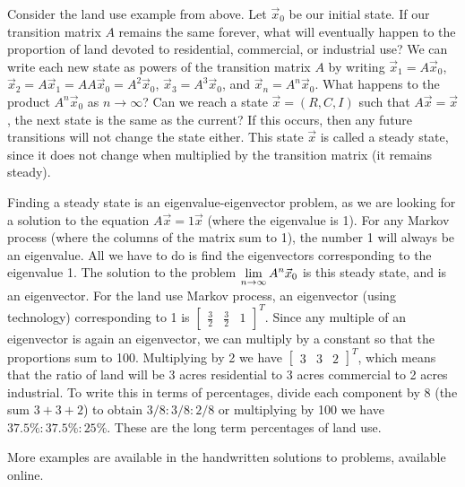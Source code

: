 

Consider the land use example from above.  Let $\vec x_0$ be our initial state. If our transition matrix $A$ remains the same forever, what will eventually happen to the proportion of land devoted to residential, commercial, or industrial use? We can write each new state as powers of the transition matrix $A$ by writing 
$\vec x_{1} = A \vec x_{0}$, $\vec x_{2}=A \vec x_{1} = AA\vec x_{0} = A^2\vec x_{0}$, $\vec x_{3}= A^3\vec x_{0}$, and $\vec x_{n}= A^n\vec x_{0}$.  What happens to the product $A^n\vec x_0$ as $n\to \infty$? Can we reach a state $\vec x = (R,C,I)$ such that $A \vec x=\vec x$, the next state is the same as the current? If this occurs, then any future transitions will not change the state either. This state $\vec x$ is called a steady state, since it does not change when multiplied by the transition matrix (it remains steady). 

Finding a steady state is an eigenvalue-eigenvector problem, as we are looking for a solution to the equation $A\vec x = 1\vec x$ (where the eigenvalue is 1). For any Markov process (where the columns of the matrix sum to 1), the number 1 will always be an eigenvalue. All we have to do is find the eigenvectors corresponding to the eigenvalue 1. The solution to the problem $\displaystyle\lim_{n\to\infty}A^n \vec x_0$ is this steady state, and is an eigenvector. For the land use Markov process, an eigenvector (using technology) corresponding to 1 is $\begin{bmatrix}\frac{3}{2}&\frac32&1\end{bmatrix}^T$. Since any multiple of an eigenvector is again an eigenvector, we can multiply by a constant so that the proportions sum to 100. Multiplying by 2  we have $\begin{bmatrix}3&3&2\end{bmatrix}^T$, which means that the ratio of land will be 3 acres residential to 3 acres commercial to 2 acres industrial. To write this in terms of percentages, divide each component by 8 (the sum $3+3+2$) to obtain $3/8:3/8:2/8$ or multiplying by 100 we have $37.5\%:37.5\%:25\%$. These are the long term percentages of land use.

More examples are available in the handwritten solutions to problems, available online.














